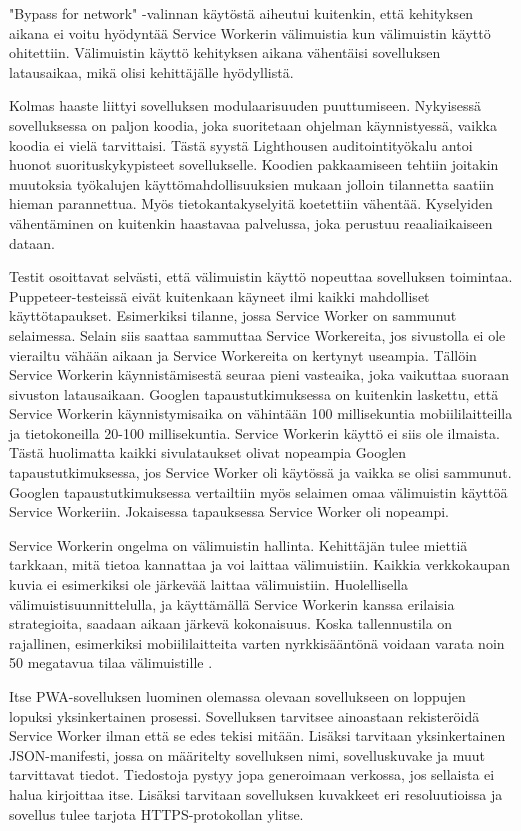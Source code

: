 \documentclass{tktltiki}
\begin{document}
"Bypass for network" -valinnan käytöstä aiheutui kuitenkin, että kehityksen aikana ei voitu hyödyntää Service Workerin välimuistia kun välimuistin käyttö ohitettiin. Välimuistin käyttö kehityksen aikana vähentäisi sovelluksen latausaikaa, mikä olisi kehittäjälle hyödyllistä.

Kolmas haaste liittyi sovelluksen modulaarisuuden puuttumiseen. Nykyisessä sovelluksessa on paljon koodia, joka suoritetaan ohjelman käynnistyessä, vaikka koodia ei vielä tarvittaisi. Tästä syystä Lighthousen auditointityökalu antoi huonot suorituskykypisteet sovellukselle. Koodien pakkaamiseen tehtiin joitakin muutoksia työkalujen käyttömahdollisuuksien mukaan jolloin tilannetta saatiin hieman parannettua. Myös tietokantakyselyitä koetettiin vähentää. Kyselyiden vähentäminen on kuitenkin haastavaa palvelussa, joka perustuu reaaliaikaiseen dataan. 

Testit osoittavat selvästi, että välimuistin käyttö nopeuttaa sovelluksen toimintaa. Puppeteer-testeissä eivät kuitenkaan käyneet ilmi kaikki mahdolliset käyttötapaukset. Esimerkiksi tilanne, jossa Service Worker on sammunut selaimessa. Selain siis saattaa sammuttaa Service Workereita, jos sivustolla ei ole vierailtu vähään aikaan ja Service Workereita on kertynyt useampia. Tällöin Service Workerin käynnistämisestä seuraa pieni vasteaika, joka vaikuttaa suoraan sivuston latausaikaan. Googlen tapaustutkimuksessa on kuitenkin laskettu, että Service Workerin käynnistymisaika on vähintään 100 millisekuntia mobiililaitteilla ja tietokoneilla 20-100 millisekuntia. Service Workerin käyttö ei siis ole ilmaista. Tästä huolimatta kaikki sivulataukset olivat nopeampia Googlen tapaustutkimuksessa, jos Service Worker oli käytössä ja vaikka se olisi sammunut. Googlen tapaustutkimuksessa vertailtiin myös selaimen omaa välimuistin käyttöä Service Workeriin. Jokaisessa tapauksessa Service Worker oli nopeampi.

Service Workerin ongelma on välimuistin hallinta. Kehittäjän tulee miettiä tarkkaan, mitä tietoa kannattaa ja voi laittaa välimuistiin. Kaikkia verkkokaupan kuvia ei esimerkiksi ole järkevää laittaa välimuistiin. Huolellisella välimuistisuunnittelulla, ja käyttämällä Service Workerin kanssa erilaisia strategioita, saadaan aikaan järkevä kokonaisuus. Koska tallennustila on rajallinen, esimerkiksi mobiililaitteita varten nyrkkisääntönä voidaan varata noin 50 megatavua tilaa välimuistille \cite{Love}.

Itse PWA-sovelluksen luominen olemassa olevaan sovellukseen on loppujen lopuksi yksinkertainen prosessi. Sovelluksen tarvitsee ainoastaan rekisteröidä Service Worker ilman että se edes tekisi mitään. Lisäksi tarvitaan yksinkertainen JSON-manifesti, jossa on määritelty sovelluksen nimi, sovelluskuvake ja muut tarvittavat tiedot. Tiedostoja pystyy jopa generoimaan verkossa, jos sellaista ei halua kirjoittaa itse. Lisäksi tarvitaan sovelluksen kuvakkeet eri resoluutioissa ja sovellus tulee tarjota HTTPS-protokollan ylitse.
\end{document}

